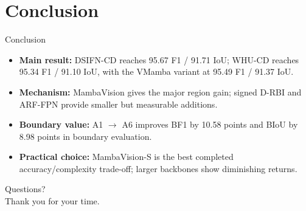 \section{Conclusion}

\begin{frame}{Conclusion}
    \begin{itemize}
        \item \textbf{Main result:} DSIFN-CD reaches 95.67 F1 / 91.71 IoU; WHU-CD reaches 95.34 F1 / 91.10 IoU, with the VMamba variant at 95.49 F1 / 91.37 IoU.
        \item \textbf{Mechanism:} MambaVision gives the major region gain; signed D-RBI and ARF-FPN provide smaller but measurable additions.
        \item \textbf{Boundary value:} A1 \(\rightarrow\) A6 improves BF1 by 10.58 points and BIoU by 8.98 points in boundary evaluation.
        \item \textbf{Practical choice:} MambaVision-S is the best completed accuracy/complexity trade-off; larger backbones show diminishing returns.
    \end{itemize}
\end{frame}

\begin{frame}[standout]
    Questions? \\
    \vspace{1em}
    \normalsize Thank you for your time.
\end{frame}
